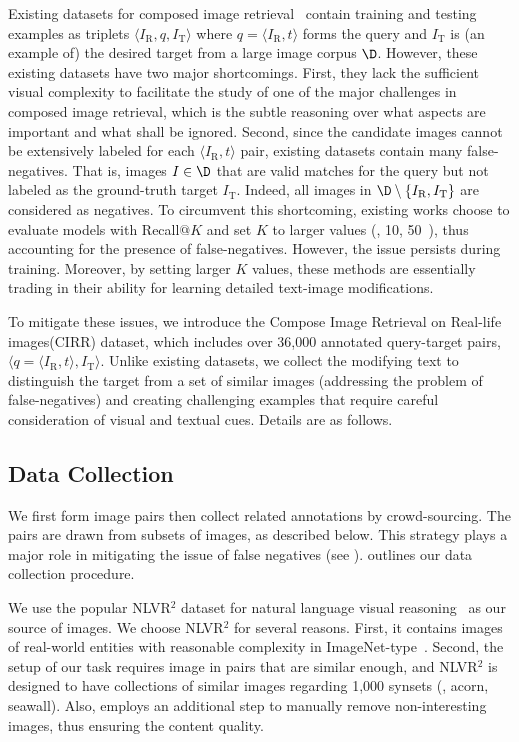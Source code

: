 \documentclass[10pt,twocolumn,letterpaper]{article}
\makeatletter
\renewcommand{\paragraph}{\@startsection{paragraph}{4}{\z@}{1.05ex \@plus 1ex \@minus .2ex}{-1em}{\normalfont\normalsize\bfseries}}
\newcommand{\dstname}{CIRR\xspace}
\newcommand{\dstnamefull}{Compose Image Retrieval on Real-life images\xspace}
\makeatother
\begin{document}
 Existing datasets for composed image retrieval~\cite{Vo_2019_tirg,fashioniq} contain training and testing examples as triplets $\langle I_{\text{R}}, q, I_{\text{T}} \rangle$ where $q = \langle I_{\text{R}}, t\rangle$ forms the query and $I_{\text{T}}$ is (an example of) the desired target from a large image corpus $\D$.
 However, these existing datasets have two major shortcomings.
 First, they lack the sufficient visual complexity to facilitate the study of one of the major challenges in composed image retrieval, which is the subtle reasoning over what aspects are important and what shall be ignored.
 Second, since the candidate images cannot be extensively labeled for each $\langle I_{\text{R}}, t\rangle$ pair, existing datasets contain many false-negatives. That is, images $I \in \D$ that are valid matches for the query but not labeled as the ground-truth target $I_{\text{T}}$. Indeed, all images in $\D \setminus \{I_{\text{R}}, I_{\text{T}}\}$ are considered as negatives. To circumvent this shortcoming, existing works choose to evaluate models with Recall$@K$ and set $K$ to larger values (\eg, 10, 50~\cite{fashioniq}), thus accounting for the presence of false-negatives. 
 However, the issue persists during training.
 Moreover, by setting larger $K$ values, these methods are essentially trading in their ability for learning detailed text-image modifications.
 
 To mitigate these issues, we introduce the \dstnamefull (\dstname) dataset, which includes over 36,000 annotated query-target pairs, $\langle q = \langle I_{\text{R}}, t \rangle, I_{\text{T}}\rangle$. Unlike existing datasets, we collect the modifying text to distinguish the target from a set of similar images (addressing the problem of false-negatives) and creating challenging examples that require careful consideration of visual and textual cues. Details are as follows.

 \subsection{Data Collection}
 We first form image pairs then collect related annotations by crowd-sourcing.
 The pairs are drawn from subsets of images, as described below. This strategy plays a major role in mitigating the issue of false negatives (see ).
  outlines our data collection procedure.
 
 \paragraph{Image source.} We use the popular NLVR$^2$ dataset for natural language visual reasoning~\cite{Suhr_2019_nlvr2} as our source of images.
 We choose NLVR$^2$ for several reasons. 
 First, it contains images of real-world entities with reasonable complexity in ImageNet-type~\cite{krizhevsky2012imagenet}. 
 Second, the setup of our task requires image in pairs that are similar enough, and NLVR$^2$ is designed to have collections of similar images regarding 1,000 synsets (\eg, acorn, seawall). 
 Also, \citet{Suhr_2019_nlvr2} employs an additional step to manually remove non-interesting images, thus ensuring the content quality.
 
\end{document}
